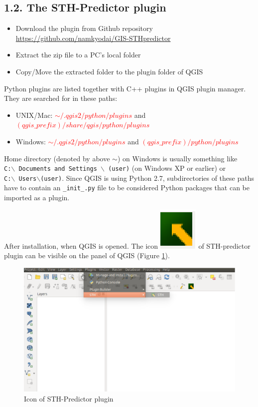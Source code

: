 \documentclass[12pt,oneside]{memoir}
\newcommand*{\STHicon}{\includegraphics[scale=0.3]{sthicon}}%
\newcommand*{\sthicon}[1]{%
\STHicon %
}
\begin{document}
\subsection{1.2. The STH-Predictor plugin}
\begin{itemize}
 \item Download the plugin from Github repository \\ \href{https://github.com/namkyodai/GIS-STHpredictor} {https://github.com/namkyodai/GIS-STHpredictor}
 \item Extract the zip file to a PC's local folder
 \item Copy/Move the extracted folder to the plugin folder of QGIS
\end{itemize}

Python plugins are listed together with C++ plugins in QGIS plugin manager. They are searched for in these paths:
\begin{itemize}
\item UNIX/Mac: \textcolor{red}{$\sim/.qgis2/python/plugins$} and \textcolor{red}{$(qgis\_prefix)/share/qgis/python/plugins$}
\item Windows: \textcolor{red}{$\sim/.qgis2/python/plugins$} and \textcolor{red}{$(qgis\_prefix)/python/plugins$}
\end{itemize}

Home directory (denoted by above $\sim$) on Windows is usually something like \\
\texttt{C:$\backslash$ Documents and Settings $\backslash$ (user)} (on Windows XP or earlier) or \\
\texttt{C:$\backslash$ Users$\backslash$(user)}. Since QGIS is using Python 2.7, subdirectories of these paths have to contain an \texttt{\_init\_.py} file to be considered Python packages that can be imported as a plugin.

After installation, when QGIS is opened. The icon \sthicon{} of STH-predictor plugin can be visible on the panel of QGIS (Figure \ref{sthscreen}).

\begin{figure}[H]
\centering
\includegraphics[scale=0.4]{sthscreen} 
\caption{Icon of STH-Predictor plugin} 
\label{sthscreen}
\end{figure}
\end{document}
